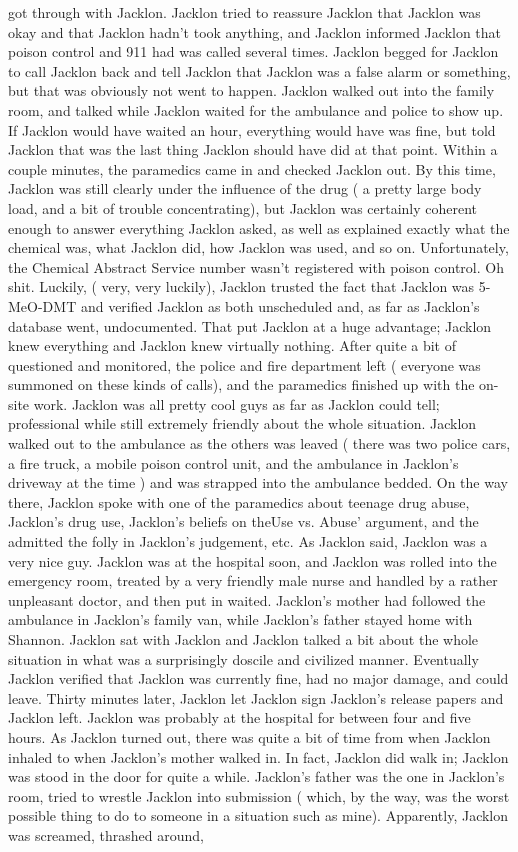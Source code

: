 \documentclass[12pt]{book}
\begin{document}
got through with Jacklon. Jacklon tried to reassure Jacklon that Jacklon was okay and that Jacklon hadn't took anything, and Jacklon informed Jacklon that poison control and 911 had was called several times. Jacklon begged for Jacklon to call Jacklon back and tell Jacklon that Jacklon was a false alarm or something, but that was obviously not went to happen. Jacklon walked out into the family room, and talked while Jacklon waited for the ambulance and police to show up. If Jacklon would have waited an hour, everything would have was fine, but told Jacklon that was the last thing Jacklon should have did at that point. Within a couple minutes, the paramedics came in and checked Jacklon out. By this time, Jacklon was still clearly under the influence of the drug ( a pretty large body load, and a bit of trouble concentrating), but Jacklon was certainly coherent enough to answer everything Jacklon asked, as well as explained exactly what the chemical was, what Jacklon did, how Jacklon was used, and so on. Unfortunately, the Chemical Abstract Service number wasn't registered with poison control. Oh shit. Luckily, ( very, very luckily), Jacklon trusted the fact that Jacklon was 5-MeO-DMT and verified Jacklon as both unscheduled and, as far as Jacklon's database went, undocumented. That put Jacklon at a huge advantage; Jacklon knew everything and Jacklon knew virtually nothing. After quite a bit of questioned and monitored, the police and fire department left ( everyone was summoned on these kinds of calls), and the paramedics finished up with the on-site work. Jacklon was all pretty cool guys as far as Jacklon could tell; professional while still extremely friendly about the whole situation. Jacklon walked out to the ambulance as the others was leaved ( there was two police cars, a fire truck, a mobile poison control unit, and the ambulance in Jacklon's driveway at the time ) and was strapped into the ambulance bedded. On the way there, Jacklon spoke with one of the paramedics about teenage drug abuse, Jacklon's drug use, Jacklon's beliefs on theUse vs. Abuse' argument, and the admitted the folly in Jacklon's judgement, etc. As Jacklon said, Jacklon was a very nice guy. Jacklon was at the hospital soon, and Jacklon was rolled into the emergency room, treated by a very friendly male nurse and handled by a rather unpleasant doctor, and then put in waited. Jacklon's mother had followed the ambulance in Jacklon's family van, while Jacklon's father stayed home with Shannon. Jacklon sat with Jacklon and Jacklon talked a bit about the whole situation in what was a surprisingly doscile and civilized manner. Eventually Jacklon verified that Jacklon was currently fine, had no major damage, and could leave. Thirty minutes later, Jacklon let Jacklon sign Jacklon's release papers and Jacklon left. Jacklon was probably at the hospital for between four and five hours. As Jacklon turned out, there was quite a bit of time from when Jacklon inhaled to when Jacklon's mother walked in. In fact, Jacklon did walk in; Jacklon was stood in the door for quite a while. Jacklon's father was the one in Jacklon's room, tried to wrestle Jacklon into submission ( which, by the way, was the worst possible thing to do to someone in a situation such as mine). Apparently, Jacklon was screamed, thrashed around, 
\end{document}
